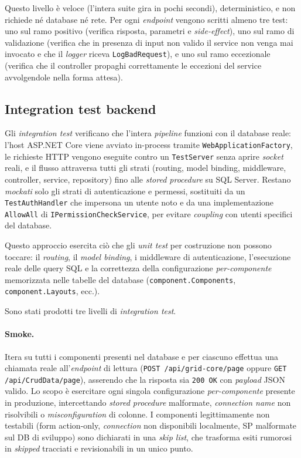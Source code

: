 Questo livello è veloce (l'intera suite gira in pochi secondi), deterministico, e
non richiede né database né rete. Per ogni \emph{endpoint} vengono scritti almeno
tre test: uno sul ramo positivo (verifica risposta, parametri e \emph{side-effect}),
uno sul ramo di validazione (verifica che in presenza di input non valido il service
non venga mai invocato e che il \emph{logger} riceva \texttt{LogBadRequest}), e uno
sul ramo eccezionale (verifica che il controller propaghi correttamente le eccezioni
del service avvolgendole nella forma attesa).

\subsection{Integration test backend}

Gli \emph{integration test} verificano che l'intera \emph{pipeline} funzioni con il
database reale: l'host ASP.NET Core viene avviato in-process tramite
\texttt{WebApplicationFactory}, le richieste HTTP vengono eseguite contro un
\texttt{TestServer} senza aprire \emph{socket} reali, e il flusso attraversa tutti
gli strati (routing, model binding, middleware, controller, service, repository)
fino alle \emph{stored procedure} su SQL Server. Restano \emph{mockati} solo gli
strati di autenticazione e permessi, sostituiti da un \texttt{TestAuthHandler} che
impersona un utente noto e da una implementazione \texttt{AllowAll} di
\texttt{IPermissionCheckService}, per evitare \emph{coupling} con utenti specifici
del database.

Questo approccio esercita ciò che gli \emph{unit test} per costruzione non possono
toccare: il \emph{routing}, il \emph{model binding}, i middleware di autenticazione,
l'esecuzione reale delle query SQL e la correttezza della configurazione
\emph{per-componente} memorizzata nelle tabelle del database
(\texttt{component.Components}, \texttt{component.Layouts}, ecc.).

Sono stati prodotti tre livelli di \emph{integration test}.

\paragraph{Smoke.} Itera su tutti i componenti presenti nel database e per ciascuno 
effettua una chiamata reale all'\emph{endpoint} di lettura
(\texttt{POST /api/grid-core/page} oppure \texttt{GET /api/CrudData/page}),
asserendo che la risposta sia \texttt{200 OK} con \emph{payload} JSON valido. Lo scopo è
esercitare ogni singola configurazione \emph{per-componente} presente in produzione,
intercettando \emph{stored procedure} malformate, \emph{connection name} non
risolvibili o \emph{misconfiguration} di colonne. I componenti legittimamente non
testabili (form action-only, \emph{connection} non disponibili localmente, SP
malformate sul DB di sviluppo) sono dichiarati in una \emph{skip list}, che trasforma esiti rumorosi
in \emph{skipped} tracciati e revisionabili in un unico punto.

